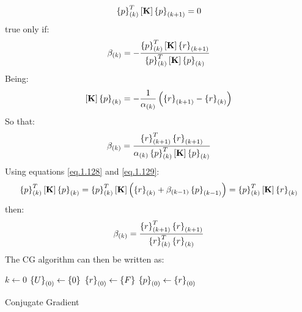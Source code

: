 \begin{equation}
\label{eq.1.129}
\left\lbrace{p}\right \rbrace_{(k)}^T\left[{\mathbf{K}}\right]\left\lbrace{p}\right \rbrace_{(k+1)}=0
\end{equation}
true only if:
\begin{equation}
\beta_{(k)}=-\frac{\left\lbrace{p}\right \rbrace_{(k)}^T\left[{\mathbf{K}}\right]\left\lbrace{r}\right \rbrace_{(k+1)}}{\left\lbrace{p}\right \rbrace_{(k)}^T\left[{\mathbf{K}}\right]\left\lbrace{p}\right \rbrace_{(k)}}
\end{equation}
Being:
\begin{equation}
\left[{\mathbf{K}}\right]\left\lbrace{p}\right \rbrace_{(k)}=-\frac{1}{\alpha_{(k)}}\left(\left\lbrace{r}\right \rbrace_{(k+1)}-\left\lbrace{r}\right \rbrace_{(k)}\right)
\end{equation}
So that:
\begin{equation}
\beta_{(k)}=\frac{\left\lbrace{r}\right \rbrace_{(k+1)}^T\left\lbrace{r}\right \rbrace_{(k+1)}}{\alpha_{(k)}\left\lbrace{p}\right \rbrace_{(k)}^T\left[{\mathbf{K}}\right]\left\lbrace{p}\right \rbrace_{(k)}}
\end{equation}
Using equations \ref{eq.1.128} and \ref{eq.1.129}:
\begin{equation}
\left\lbrace{p}\right \rbrace_{(k)}^T\left[{\mathbf{K}}\right]\left\lbrace{p}\right \rbrace_{(k)}=\left\lbrace{p}\right \rbrace_{(k)}^T\left[{\mathbf{K}}\right]\left(\left\lbrace{r}\right \rbrace_{(k)} +\beta_{(k-1)}\left\lbrace{p}\right \rbrace_{(k-1)}\right)=\left\lbrace{p}\right \rbrace_{(k)}^T\left[{\mathbf{K}}\right]\left\lbrace{r}\right \rbrace_{(k)}
\end{equation}
then:
\begin{equation}
\beta_{(k)}=\frac{\left\lbrace{r}\right \rbrace_{(k+1)}^T\left\lbrace{r}\right \rbrace_{(k+1)}}{\left\lbrace{r}\right \rbrace_{(k)}^T\left\lbrace{r}\right \rbrace_{(k)}}
\end{equation}
The CG algorithm can then be written as:
\begin{algorithm}

$k\gets 0$\;
$\left\lbrace{U}\right \rbrace_{(0)}\gets\left\lbrace{0}\right \rbrace$\;
$\left\lbrace{r}\right \rbrace_{(0)}\gets \left\lbrace{F}\right \rbrace$\;
$\left\lbrace{p}\right \rbrace_{(0)}\gets \left\lbrace{r}\right \rbrace_{(0)}$\;
 \caption{Conjugate Gradient \label{CG}}
\end{algorithm}
